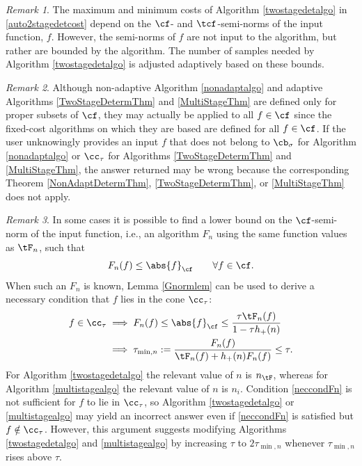 \documentclass[]{elsarticle}
\theoremstyle{definition}
\theoremstyle{remark}
\newtheorem{rem}{Remark}
\newcommand{\Fnorm}[1]{\abs{#1}_{\cf}}
\begin{document}
\begin{rem} The maximum and minimum costs of Algorithm \ref{twostagedetalgo} in \eqref{auto2stagedetcost} depend on the $\cf$- and $\tcf$-semi-norms of the input function, $f$.  However, the semi-norms of $f$ are not input to the algorithm, but rather are bounded by the algorithm.  The number of samples needed by Algorithm \ref{twostagedetalgo} is adjusted adaptively based on these bounds.
\end{rem}

\begin{rem}  Although non-adaptive Algorithm \ref{nonadaptalgo} and adaptive Algorithms \ref{TwoStageDetermThm} and \ref{MultiStageThm} are defined only for proper subsets of $\cf$, they may actually be applied to all $f\in \cf$ since the fixed-cost algorithms on which they are based are defined for all $f\in \cf$.  If the user unknowingly provides an input $f$ that does not belong to $\cb_\sigma$ for Algorithm \ref{nonadaptalgo} or $\cc_{\tau}$ for Algorithms \ref{TwoStageDetermThm} and \ref{MultiStageThm}, the answer returned may be wrong because the corresponding Theorem \ref{NonAdaptDetermThm}, \ref{TwoStageDetermThm}, or \ref{MultiStageThm} does not apply.
\end{rem}

\begin{rem} \label{neccondrem} In some cases it is possible to find a lower bound on the $\cf$-semi-norm of the input function, i.e., an algorithm $F_n$ using the same function values as $\tF_n$, such that
\[
F_n(f) \le \Fnorm{f} \qquad \forall f \in \cf.
\]
When such an $F_n$ is known, Lemma \ref{Gnormlem} can be used to derive a necessary condition that $f$ lies in the cone $\cc_\tau$:
\begin{align}
\nonumber
f \in \cc_\tau 
& \implies F_n(f) \le \Fnorm{f} \le \frac{\tau \tF_n(f)}{1-\tau h_+(n)}\\
& \implies \tau_{\min,n}:= \frac{F_n(f)}{\tF_n(f) + h_+(n) F_n(f)} \le \tau.
\label{neccondFn}
\end{align}
For Algorithm \ref{twostagedetalgo} the relevant value of $n$ is $n_{\tF}$, whereas for Algorithm \ref{multistagealgo} the relevant value of $n$ is $n_i$.
Condition \eqref{neccondFn} is not sufficient for $f$ to lie in $\cc_{\tau}$, so Algorithm \ref{twostagedetalgo} or \ref{multistagealgo} may yield an incorrect answer even if \eqref{neccondFn} is satisfied but $f \notin \cc_{\tau}$.  However, this argument suggests modifying Algorithms \ref{twostagedetalgo} and \ref{multistagealgo} by increasing $\tau$ to $2 \tau_{\min,n}$ whenever  $\tau_{\min,n}$ rises above $\tau$. 
\end{rem}
\end{document}

